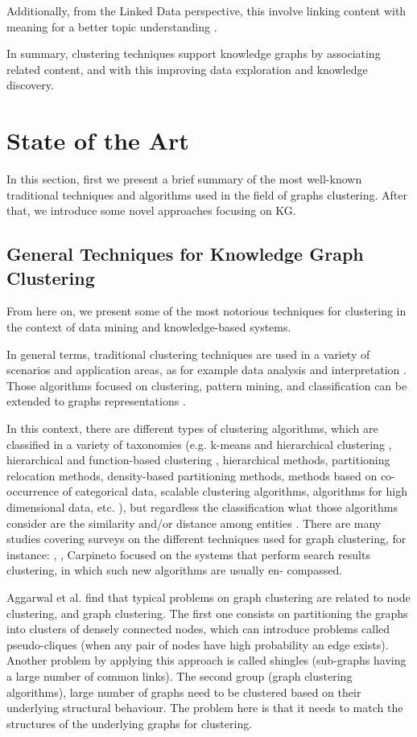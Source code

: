 \documentclass[runningheads]{llncs}
\begin{document}
Additionally, from the Linked Data perspective, this involve linking content with meaning for a better topic understanding \cite{Pan}.

In summary, clustering techniques support knowledge graphs by associating related content, and with this improving data exploration and knowledge discovery.


\section{State of the Art}\label{state-art}
In this section, first we present a brief summary of the most well-known traditional techniques and algorithms used in the field of graphs clustering. After that, we introduce some novel approaches focusing on KG. 

\subsection{General Techniques for Knowledge Graph Clustering} \label{general-techniques}
From here on, we present some of the most notorious techniques for clustering in the context of data mining and knowledge-based systems.

In general terms, traditional clustering techniques are used in a variety of scenarios and application areas, as for example data analysis and interpretation \cite{Pedrycz}. Those algorithms focused on clustering, pattern mining, and classification can be extended to graphs representations \cite{Aggarwal}.

In this context, there are different types of clustering algorithms, which are classified in a variety of taxonomies (e.g. k-means and hierarchical clustering \cite{Zacharski}, hierarchical and function-based clustering \cite{Pedrycz}, hierarchical methods, partitioning relocation methods, density-based partitioning methods, methods based on co-occurrence of categorical data, scalable clustering algorithms, algorithms for high dimensional data, etc. \cite{Berkhin}), but regardless the classification what those algorithms consider are the similarity and/or distance among entities \cite{Pedrycz}.
There are many studies covering surveys on the different techniques used for graph clustering, for instance: \cite{Schaeffer}, \cite{Aggarwal}, \cite{Carpineto} Carpineto focused on the systems that perform search results clustering, in which such new algorithms are usually en- compassed.

Aggarwal et al.  \cite{Aggarwal} find that typical problems on graph clustering are related to node clustering, and graph clustering. The first one consists on partitioning the graphs into clusters of densely connected nodes, which can introduce problems called pseudo-cliques (when any pair of nodes have high probability an edge exists). Another problem by applying this approach is called shingles (sub-graphs having a large number of common links). The second group (graph clustering algorithms), large number of graphs need to be clustered based on their underlying structural behaviour. The problem here is that it needs to match the structures of the underlying graphs for clustering.
\end{document}

